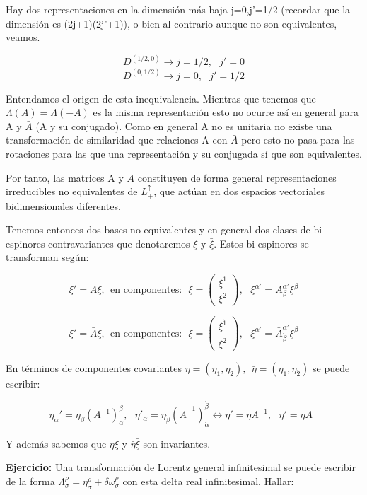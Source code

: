 Hay dos representaciones en la dimensión más baja j=0,j'=1/2 (recordar que la dimensión es (2j+1)(2j'+1)), o bien al contrario aunque no son equivalentes, veamos.

$$D^{(1/2,0)} \longrightarrow j=1/2, \ \ \ j'=0$$
$$D^{(0, 1/2)} \longrightarrow j=0, \ \ \ j'=1/2$$

Entendamos el origen de esta inequivalencia. Mientras que tenemos que $\Lambda (A)=\Lambda (-A)$ es la misma representación esto no ocurre así en general para A y $\bar{A}$ (A y su conjugado). Como en general A no es unitaria no existe una transformación de similaridad que relaciones A con $\bar{A}$ pero esto no pasa para las rotaciones para las que una representación y su conjugada sí que son equivalentes.

\smallskip
Por tanto, las matrices A y $\bar{A}$ constituyen de forma general representaciones irreducibles no equivalentes de $L^\uparrow _+$, que actúan en dos espacios vectoriales bidimensionales diferentes.

Tenemos entonces dos bases no equivalentes y en general dos clases de bi-espinores contravariantes que denotaremos $\xi$ y $\bar{\xi}$. Estos bi-espinores se transforman según:

$$\xi '=A\xi, \ \ \text{en componentes:} \ \ \ \xi =\left ( \begin{array}{c}
  \xi ^1  \\
 \xi ^2
\end{array}\right), \ \ \ \xi ^{\alpha '}=A ^{\alpha '}_\beta \xi ^\beta$$

$$\xi '=\bar{A}\xi, \ \ \text{en componentes:} \ \ \ \xi =\left ( \begin{array}{c}
  \xi ^\dot{1}  \\
 \xi ^\dot{2}
\end{array}\right), \ \ \ \xi ^{\dot{\alpha} '}=\bar{A} ^{\dot{\alpha} '}_{\dot{\beta}} \xi ^\dot{\beta}$$

En términos de componentes covariantes $\eta =(\eta _1 , \eta _2), \ \ \bar{\eta}=(\eta _{\dot{1}},\eta _{\dot{2}})$ se puede escribir:

$$\eta _{\alpha }' = \eta _{\beta} (A^{-1})^\beta _\alpha , \ \ \ \eta '_{\dot{\alpha}}=\eta _{\dot{ \beta}}(\bar{A}^{-1})^{\dot{\beta}}_{\dot{ \alpha}} \leftrightarrow \eta '=\eta A^{-1}, \ \ \ \bar{\eta}'=\bar{\eta}A^+$$

Y además sabemos que $\eta \xi$ y $ \bar{\eta}\bar{\xi}$ son invariantes.

\smallskip
\textbf{Ejercicio:} Una transformación de Lorentz general infinitesimal se puede escribir de la forma $\Lambda _\sigma ^\rho = \eta ^\rho _\sigma + \delta \omega ^\rho _\sigma$ con esta delta real infinitesimal. Hallar:

